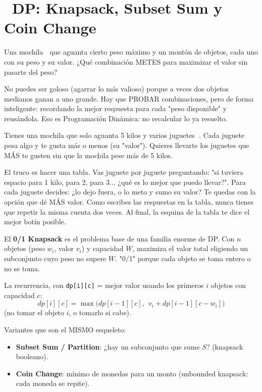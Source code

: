 \chapter[\emj{🎒}~DP: Knapsack, Subset Sum y Coin Change]{~DP: Knapsack, Subset Sum y Coin Change}

\begin{dsaquees}

Una mochila 🎒 que aguanta cierto peso máximo y un montón de objetos, cada
uno con su peso y su valor. ¿Qué combinación METES para maximizar el
valor sin pasarte del peso?

No puedes ser goloso (agarrar lo más valioso) porque a veces dos objetos
medianos ganan a uno grande. Hay que PROBAR combinaciones, pero de forma
inteligente: recordando la mejor respuesta para cada "peso disponible" y
reusándola. Eso es Programación Dinámica: no recalcular lo ya resuelto.

\end{dsaquees}

\begin{dsanino}

Tienes una mochila que solo aguanta 5 kilos y varios juguetes 🧸. Cada
juguete pesa algo y te gusta más o menos (su "valor"). Quieres llevarte
los juguetes que MÁS te gusten sin que la mochila pese más de 5 kilos.

El truco es hacer una tabla. Vas juguete por juguete preguntando: "si
tuviera espacio para 1 kilo, para 2, para 3... ¿qué es lo mejor que puedo
llevar?". Para cada juguete decides: ¿lo dejo fuera, o lo meto y sumo su
valor? Te quedas con la opción que dé MÁS valor. Como escribes las
respuestas en la tabla, nunca tienes que repetir la misma cuenta dos
veces. Al final, la esquina de la tabla te dice el mejor botín posible.

\end{dsanino}

\begin{dsaotraforma}

El \textbf{0/1 Knapsack} es el problema base de una familia enorme de DP.
Con $n$ objetos (peso $w_i$, valor $v_i$) y capacidad $W$, maximiza el
valor total eligiendo un subconjunto cuyo peso no supere $W$. "0/1"
porque cada objeto se toma entero o no se toma.

La recurrencia, con \verb|dp[i][c]| = mejor valor usando los primeros $i$
objetos con capacidad $c$:
\[ dp[i][c] = \max\big(dp[i-1][c],\ \ v_i + dp[i-1][c - w_i]\big) \]
(no tomar el objeto $i$, o tomarlo si cabe).

Variantes que son el MISMO esqueleto:
\begin{itemize}
\item \textbf{Subset Sum / Partition}: ¿hay un subconjunto que sume $S$?
      (knapsack booleano).
\item \textbf{Coin Change}: mínimo de monedas para un monto (unbounded
      knapsack: cada moneda se repite).
\end{itemize}

\end{dsaotraforma}

